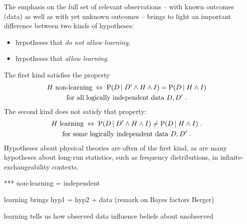 \documentclass[\ifafour a4paper,12pt,\else a5paper,10pt,\fi%
onecolumn,oneside,article,%
british%
]{memoir}
\theoremstyle{remark}
\theoremstyle{innote}
\newcommand*{\p}{\mathrm{P}}%
\renewcommand*{\|}[1][]{\nonscript\,#1\vert\nonscript\;\mathopen{}}
\newcommand*{\propf}[1]{\,#1\,}
\newcommand*{\yK}{I}
\newcommand*{\eq}{\mathrel{\!=\!}}
\newcommand*{\liff}{\mathrel{\;\Leftrightarrow\;}}
\begin{document}
The emphasis on the full set of relevant observations -- with known
outcomes (data) as well as with yet unknown outcomes -- brings to light an
important difference between two kinds of hypotheses:
\begin{itemize}
\item hypotheses that \emph{do not allow learning},
\item hypotheses that \emph{allow learning}.
\end{itemize}
The
first kind satisfies the property
\begin{multline}
  \label{eq:nonlearning_hyp}
\text{$H$ non-learning} \liff  \p( D \| D' \land H \land \yK) = 
\p( D \| H \land \yK)
\\\text{for all logically independent data $D, D'$}\;.
\end{multline}
The second kind does not satisfy that property:
\begin{multline}
  \label{eq:learning_hyp}
\text{$H$ learning} \liff  \p( D \| D' \land H \land \yK) \ne 
  \p( D \| H \land \yK) \;.
\\\text{for some logically independent data $D, D'$}\;.
\end{multline}
Hypotheses about physical theories are often of the first kind, as are
many hypotheses about long-run statistics, such as frequency distributions, in
infinite-exchangeability contexts.

*** non-learning = independent

learning brings hyp1 = hyp2 + data (remark on Bayes factors Berger)

learning tells us how observed data influence beliefs about unobserved






\end{document}

